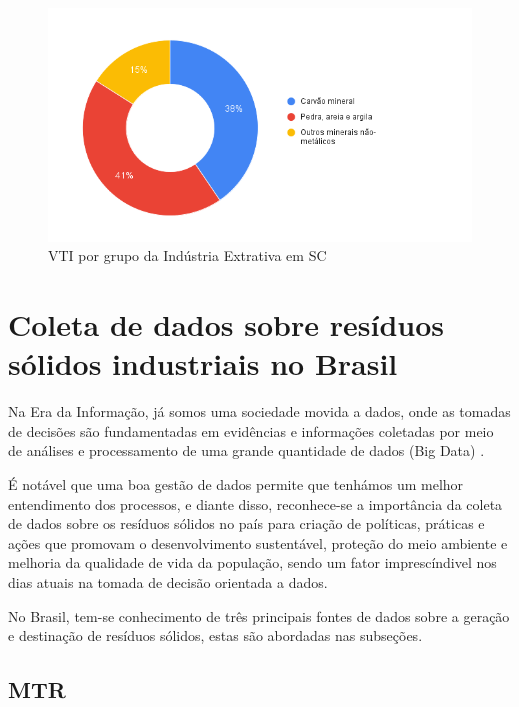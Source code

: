 \begin{figure}[ht]
	\caption{\label{fig:pia_ie} \gls{VTI} por grupo da Indústria Extrativa em \gls{SC} }
	\begin{center}
		\includegraphics[scale=0.6]{images/pia-ibge-2021-ie.png}
	\end{center}
\end{figure}

\section{Coleta de dados sobre resíduos sólidos industriais no Brasil}

Na Era da Informação, já somos uma sociedade movida a dados, onde as tomadas de decisões são fundamentadas em evidências e informações coletadas por meio de análises e processamento de uma grande quantidade de dados (Big Data) \cite{castells_information_2010}. 

É notável que uma boa gestão de dados permite que tenhámos um melhor entendimento dos processos, e diante disso, reconhece-se a importância da coleta de dados sobre os resíduos sólidos no país para criação de políticas, práticas e ações que promovam o desenvolvimento sustentável, proteção do meio ambiente e melhoria da qualidade de vida da população, sendo um fator imprescíndivel nos dias atuais na tomada de decisão orientada a dados.

No Brasil, tem-se conhecimento de três principais fontes de dados sobre a geração e destinação de resíduos sólidos, estas são abordadas nas subseções.
\subsection{MTR}

